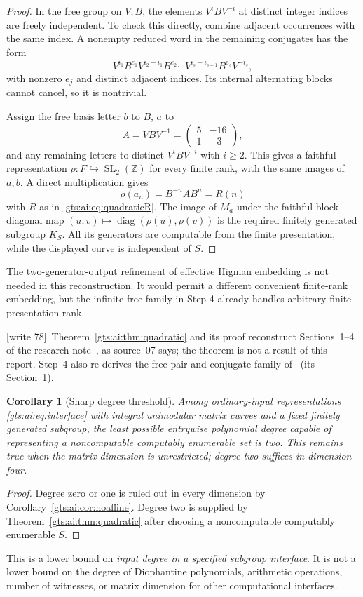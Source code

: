 \documentclass[11pt,letterpaper]{article}
\newtheorem{corollary}[theorem]{Corollary}
\theoremstyle{definition}
\theoremstyle{remark}
\newcommand{\Z}{\mathbb Z}
\newcommand{\SL}{\operatorname{SL}}
\newcommand{\diag}{\operatorname{diag}}
\newcommand{\wtagb}{\textup{[write 78]}}
\begin{document}
\begin{proof}
In the free group on $V,B$, the elements $V^iBV^{-i}$ at distinct integer indices are freely independent. To check this directly, combine adjacent occurrences with the same index. A nonempty reduced word in the remaining conjugates has the form
\[
 V^{i_1}B^{e_1}V^{i_2-i_1}B^{e_2}\cdots
 V^{i_s-i_{s-1}}B^{e_s}V^{-i_s},
\]
with nonzero $e_j$ and distinct adjacent indices. Its internal alternating blocks cannot cancel, so it is nontrivial.

Assign the free basis letter $b$ to $B$, $a$ to
\[
 A=VBV^{-1}=\begin{pmatrix}5&-16\\1&-3\end{pmatrix},
\]
and any remaining letters to distinct $V^iBV^{-i}$ with $i\ge2$. This gives a faithful representation $\rho:F\hookrightarrow\SL_2(\Z)$ for every finite rank, with the same images of $a,b$. A direct multiplication gives
\[
 \rho(a_n)=B^{-n}AB^n=R(n)
\]
with $R$ as in \eqref{gts:ai:eq:quadraticR}. The image of $M_a$ under the faithful block-diagonal map
$(u,v)\mapsto\diag(\rho(u),\rho(v))$ is the required finitely generated subgroup $K_S$. All its generators are computable from the finite presentation, while the displayed curve is independent of $S$.
\end{proof}
The two-generator-output refinement of effective Higman embedding is not needed in this reconstruction. It would permit a different convenient finite-rank embedding, but the infinite free family in Step 4 already handles arbitrary finite presentation rank.

\wtagb\ Theorem~\ref{gts:ai:thm:quadratic} and its proof reconstruct Sections~1--4 of the research note~\cite{repo-comm}, as source~07 says; the theorem is not a result of this report. Step~4 also re-derives the free pair and conjugate family of~\cite{repo-unip} (its Section~1).

\begin{corollary}[Sharp degree threshold]\label{gts:ai:cor:degree}
Among ordinary-input representations \eqref{gts:ai:eq:interface} with integral unimodular matrix curves and a fixed finitely generated subgroup, the least possible entrywise polynomial degree capable of representing a noncomputable computably enumerable set is two. This remains true when the matrix dimension is unrestricted; degree two suffices in dimension four.
\end{corollary}
\begin{proof}
Degree zero or one is ruled out in every dimension by Corollary~\ref{gts:ai:cor:noaffine}. Degree two is supplied by Theorem~\ref{gts:ai:thm:quadratic} after choosing a noncomputable computably enumerable $S$.
\end{proof}
This is a lower bound on \emph{input degree in a specified subgroup interface}. It is not a lower bound on the degree of Diophantine polynomials, arithmetic operations, number of witnesses, or matrix dimension for other computational interfaces.
\end{document}
